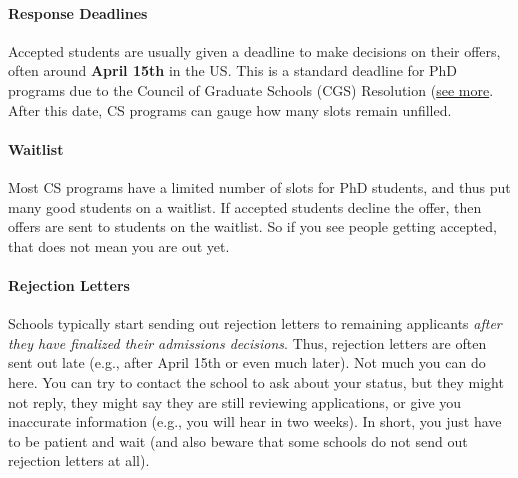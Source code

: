 \documentclass[oneside,11pt,dvipsnames]{book}
\begin{document}
\paragraph{Response Deadlines} Accepted students are usually given a deadline to make decisions on their offers, often around \textbf{April 15th} in the US. This is a standard deadline for PhD programs due to the Council of Graduate Schools (CGS) Resolution (\href{https://cgsnet.org/wp-content/uploads/2024/01/CGS_April15_Resolution_Jan312024.pdf}{see more}. After this date, CS programs can gauge how many slots remain unfilled.

\paragraph{Waitlist} Most CS programs have a limited number of slots for PhD students, and thus put many good students on a waitlist.  If accepted students decline the offer, then offers are sent to students on the waitlist. So if you see people getting accepted, that does not mean you are out yet.

\paragraph{Rejection Letters} Schools typically start sending out rejection letters to remaining applicants \emph{after they have finalized their admissions decisions}. Thus, rejection letters are often sent out late (e.g., after April 15th or even much later). Not much you can do here. You can try to contact the school to ask about your status, but they might not reply, they might say they are still reviewing applications, or give you inaccurate information (e.g., you will hear in two weeks). In short, you just have to be patient and wait (and also beware that some schools do not send out rejection letters at all).



\end{document}
